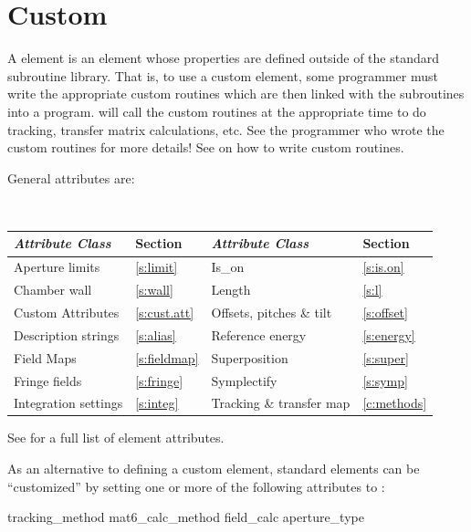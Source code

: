 \section{Custom}
\label{s:custom}

A  element is an element whose properties are defined
outside of the standard \bmad subroutine library. That is, to use a
custom element, some programmer must write the appropriate custom
routines which are then linked with the \bmad subroutines into a
program. \bmad will call the custom routines at the appropriate time
to do tracking, transfer matrix calculations, etc. See the programmer
who wrote the custom routines for more details! See
 on how to write custom routines.

General  attributes are:
\begin{center}
\tt
\begin{tabular}{llll} \toprule
  {\sl Attribute Class}      & Section           & {\sl Attribute Class}      & Section         \\ \midrule
  Aperture limits            & \ref{s:limit}     & Is_on                      & \ref{s:is.on}   \\
  Chamber wall               & \ref{s:wall}      & Length                     & \ref{s:l}       \\
  Custom Attributes          & \ref{s:cust.att}  & Offsets, pitches \& tilt   & \ref{s:offset}  \\
  Description strings        & \ref{s:alias}     & Reference energy           & \ref{s:energy}  \\ 
  Field Maps                 & \ref{s:fieldmap}  & Superposition              & \ref{s:super}   \\
  Fringe fields              & \ref{s:fringe}    & Symplectify                & \ref{s:symp}    \\
  Integration settings       & \ref{s:integ}     & Tracking \& transfer map   & \ref{c:methods} \\ 
  \bottomrule
\end{tabular}
\end{center}
\toffset
See  for a full list of element attributes.

As an alternative to defining a custom element, standard elements can
be ``customized'' by setting one or more of the following attributes
to :
\begin{example}
  tracking_method       
  mat6_calc_method      
  field_calc            
  aperture_type         
\end{example}

